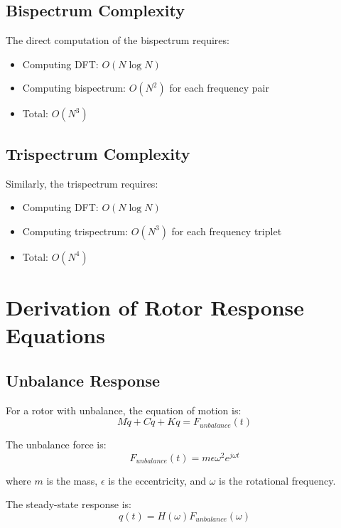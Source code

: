 \subsection{Bispectrum Complexity}

The direct computation of the bispectrum requires:
\begin{itemize}
    \item Computing DFT: $O(N \log N)$
    \item Computing bispectrum: $O(N^2)$ for each frequency pair
    \item Total: $O(N^3)$
\end{itemize}

\subsection{Trispectrum Complexity}

Similarly, the trispectrum requires:
\begin{itemize}
    \item Computing DFT: $O(N \log N)$
    \item Computing trispectrum: $O(N^3)$ for each frequency triplet
    \item Total: $O(N^4)$
\end{itemize}

\section{Derivation of Rotor Response Equations}

\subsection{Unbalance Response}

For a rotor with unbalance, the equation of motion is:
\begin{equation}
M\ddot{q} + C\dot{q} + Kq = F_{unbalance}(t)
\end{equation}

The unbalance force is:
\begin{equation}
F_{unbalance}(t) = m \epsilon \omega^2 e^{j\omega t}
\end{equation}

where $m$ is the mass, $\epsilon$ is the eccentricity, and $\omega$ is the rotational frequency.

The steady-state response is:
\begin{equation}
q(t) = H(\omega) F_{unbalance}(\omega)
\end{equation}

